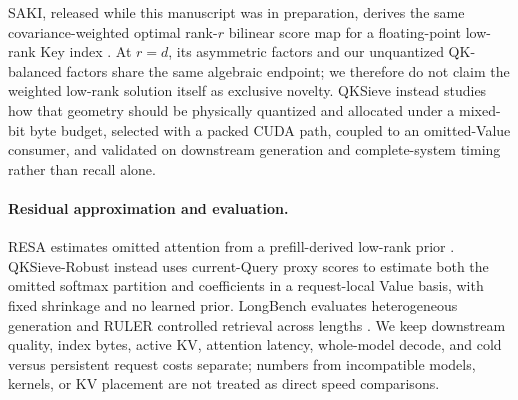 SAKI, released while this manuscript was in preparation, derives the same
covariance-weighted optimal rank-$r$ bilinear score map for a floating-point
low-rank Key index \citep{zhang2026saki}.  At $r=d$, its asymmetric factors
and our unquantized QK-balanced factors share the same algebraic endpoint;
we therefore do not claim the weighted low-rank solution itself as exclusive
novelty.  QKSieve instead studies how that geometry should be physically
quantized and allocated under a mixed-bit byte budget, selected with a packed
CUDA path, coupled to an omitted-Value consumer, and validated on downstream
generation and complete-system timing rather than recall alone.

\paragraph{Residual approximation and evaluation.}
RESA estimates omitted attention from a prefill-derived low-rank prior
\citep{yang2026resa}.  QKSieve-Robust instead uses current-Query proxy scores
to estimate both the omitted softmax partition and coefficients in a
request-local Value basis, with fixed shrinkage and no learned prior.
LongBench evaluates heterogeneous generation and RULER controlled retrieval
across lengths \citep{bai2024longbench,hsieh2024ruler}.  We keep downstream
quality, index bytes, active KV, attention latency, whole-model decode, and
cold versus persistent request costs separate; numbers from incompatible
models, kernels, or KV placement are not treated as direct speed comparisons.
